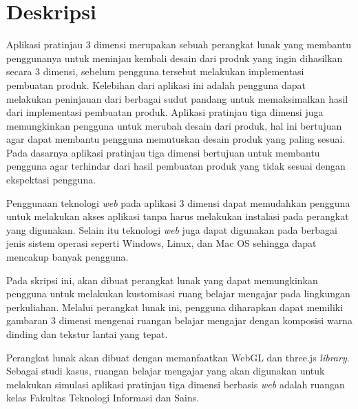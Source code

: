 \documentclass[a4paper,twoside]{article}
\begin{document}
\title{\@judultopik}
\author{\nama \textendash \@npm} 

\newcommand{\nama}{Nancy Valentina}
\newcommand{\@npm}{2014730049}
\newcommand{\@judultopik}{Aplikasi Pratinjau 3 Dimensi Berbasis Web} %
\newcommand{\jumpemb}{1} %
\newcommand{\tanggal}{12/09/2017}


\maketitle


\section{Deskripsi}
Aplikasi pratinjau 3 dimensi merupakan sebuah perangkat lunak yang membantu penggunanya untuk meninjau kembali desain dari produk yang ingin dihasilkan secara 3 dimensi, sebelum pengguna tersebut melakukan implementasi pembuatan produk. Kelebihan dari aplikasi ini adalah pengguna dapat melakukan peninjauan dari berbagai sudut pandang untuk memaksimalkan hasil dari implementasi pembuatan produk. Aplikasi pratinjau tiga dimensi juga memungkinkan pengguna untuk merubah desain dari produk, hal ini bertujuan agar dapat membantu pengguna memutuskan desain produk yang paling sesuai. Pada dasarnya aplikasi pratinjau tiga dimensi bertujuan untuk membantu pengguna agar terhindar dari hasil pembuatan produk yang tidak sesuai dengan ekspektasi pengguna.

Penggunaan teknologi {\it web} pada aplikasi 3 dimensi dapat memudahkan pengguna untuk melakukan akses aplikasi tanpa harus melakukan instalasi pada perangkat yang digunakan. Selain itu teknologi {\it web} juga dapat digunakan pada berbagai jenis sistem operasi seperti Windows, Linux, dan Mac OS sehingga dapat mencakup banyak pengguna.

Pada skripsi ini, akan dibuat perangkat lunak yang dapat memungkinkan pengguna untuk melakukan kustomisasi ruang belajar mengajar pada lingkungan perkuliahan. Melalui perangkat lunak ini, pengguna diharapkan dapat memiliki gambaran 3 dimensi mengenai ruangan belajar mengajar dengan komposisi warna dinding dan tekstur lantai yang tepat.

Perangkat lunak akan dibuat dengan memanfaatkan WebGL dan three.js {\it library}. Sebagai studi kasus, ruangan belajar mengajar yang akan digunakan untuk melakukan simulasi aplikasi pratinjau tiga dimensi berbasis {\it web} adalah ruangan kelas Fakultas Teknologi Informasi dan Sains.
\end{document}
